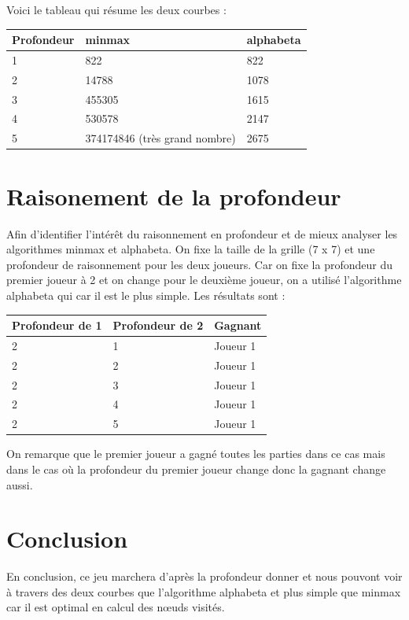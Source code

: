 \documentclass[11pt, pdflatex]{report}
\begin{document}
Voici le tableau qui résume les deux courbes :
 
 \begin{center}
    \begin{tabular}{|l|l|l|}\hline   
    Profondeur&      minmax&      alphabeta      \\\hline
    1&      822&      822      \\\hline
    2&      14788&      1078      \\\hline
    3&      455305&      1615      \\\hline
    4&      530578&      2147      \\\hline
    5&      374174846 (très grand nombre)&      2675      \\\hline
    \end{tabular}
\end{center}

\newpage
\section{Raisonement de la profondeur}
Afin d’identifier l’intérêt du raisonnement en profondeur et de mieux analyser les algorithmes minmax et alphabeta. On fixe la taille de la grille (7 x 7)  et une profondeur de raisonnement pour les deux joueurs. Car on fixe la profondeur du premier joueur à 2 et on change pour le deuxième joueur, on a utilisé l’algorithme alphabeta qui car il est le plus simple. Les résultats sont :  \par

\begin{center}
    \begin{tabular}{|l|l|l|}\hline   
        Profondeur de 1\up{er}&      Profondeur de 2\up{ème}&      Gagnant      \\\hline
    2&      1&      Joueur 1\up{er}      \\\hline
    2&      2&      Joueur 1\up{er}      \\\hline
    2&      3&      Joueur 1\up{er}      \\\hline
    2&      4&      Joueur 1\up{er}      \\\hline
    2&      5&      Joueur 1\up{er}      \\\hline
    \end{tabular}
\end{center}

On remarque que le premier joueur a gagné toutes les parties dans ce cas mais dans le cas où la profondeur du premier joueur change donc la gagnant change aussi.\par

\section{Conclusion}
En conclusion, ce jeu marchera d’après la profondeur donner et nous pouvont voir à travers des deux courbes que l’algorithme alphabeta et plus simple que minmax car il est optimal en calcul des nœuds visités. 
\end{document}

